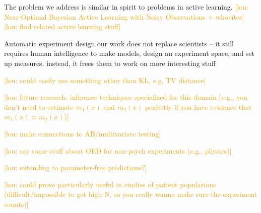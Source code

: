 \documentclass{article}
\newcommand{\lou}[1]{\textcolor{orange}{[lou: #1]}}
\newcommand{\cas}[1]{ \textsf{\color{darkgray} \scriptsize #1} }
\begin{document}
The problem we address is similar in spirit to problems in active learning.
\lou{Near-Optimal Bayesian Active Learning with Noisy Observations + whocites}
\lou{find related active learning stuff}

Automatic experiment design
\cas{our work does not replace scientists -- it still requires human intelligence to make models, design an experiment space, and set up measures. instead, it frees them to work on more interesting stuff}

\lou{could easily use something other than KL, e.g, TV distance}

\lou{future research: inference techniques specialized for this domain (e.g., you don't need to estimate $m_1(x)$ and $m_2(x)$ perfectly if you have evidence that $m_1(x) \approx m_2(x)$)}

\lou{make connections to AB/multivariate testing}

\lou{say some stuff about OED for non-psych experiments (e.g., physics)}

\lou{extending to parameter-free predictions?}

\lou{could prove particularly useful in studies of patient populations (difficult/impossible to get high N, so you really wanna make sure the experiment counts)}



\end{document}
